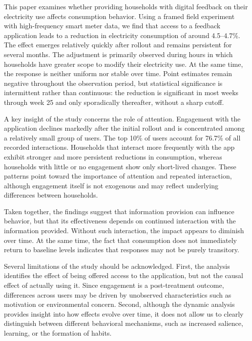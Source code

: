 This paper examines whether providing households with digital feedback on their electricity use affects consumption behavior. Using a framed field experiment with high-frequency smart meter data, we find that access to a feedback application leads to a reduction in electricity consumption of around 4.5--4.7\%. The effect emerges relatively quickly after rollout and remains persistent for several months. The adjustment is primarily observed during hours in which households have greater scope to modify their electricity use. At the same time, the response is neither uniform nor stable over time. Point estimates remain negative throughout the observation period, but statistical significance is intermittent rather than continuous: the reduction is significant in most weeks through week 25 and only sporadically thereafter, without a sharp cutoff.

A key insight of the study concerns the role of attention. Engagement with the application declines markedly after the initial rollout and is concentrated among a relatively small group of users. The top 10\% of users account for 76.7\% of all recorded interactions. Households that interact more frequently with the app exhibit stronger and more persistent reductions in consumption, whereas households with little or no engagement show only short-lived changes. These patterns point toward the importance of attention and repeated interaction, although engagement itself is not exogenous and may reflect underlying differences between households.

Taken together, the findings suggest that information provision can influence behavior, but that its effectiveness depends on continued interaction with the information provided. Without such interaction, the impact appears to diminish over time. At the same time, the fact that consumption does not immediately return to baseline levels indicates that responses may not be purely transitory.

Several limitations of the study should be acknowledged. First, the analysis identifies the effect of being offered access to the application, but not the causal effect of actually using it. Since engagement is a post-treatment outcome, differences across users may be driven by unobserved characteristics such as motivation or environmental concern. Second, although the dynamic analysis provides insight into how effects evolve over time, it does not allow us to clearly distinguish between different behavioral mechanisms, such as increased salience, learning, or the formation of habits.

